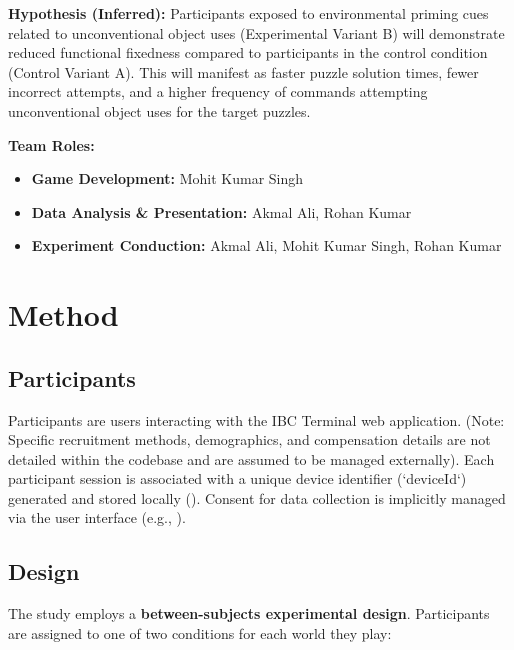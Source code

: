 \documentclass{article}
\begin{document}
\textbf{Hypothesis (Inferred):} Participants exposed to environmental priming cues related to unconventional object uses (Experimental Variant B) will demonstrate reduced functional fixedness compared to participants in the control condition (Control Variant A). This will manifest as faster puzzle solution times, fewer incorrect attempts, and a higher frequency of commands attempting unconventional object uses for the target puzzles.

\textbf{Team Roles:}
\begin{itemize}
    \item \textbf{Game Development:} Mohit Kumar Singh
    \item \textbf{Data Analysis \& Presentation:} Akmal Ali, Rohan Kumar
    \item \textbf{Experiment Conduction:} Akmal Ali, Mohit Kumar Singh, Rohan Kumar
\end{itemize}

\section{Method}

\subsection{Participants}
Participants are users interacting with the IBC Terminal web application. (Note: Specific recruitment methods, demographics, and compensation details are not detailed within the codebase and are assumed to be managed externally). Each participant session is associated with a unique device identifier (`deviceId`) generated and stored locally (). Consent for data collection is implicitly managed via the user interface (e.g., ).

\subsection{Design}
The study employs a \textbf{between-subjects experimental design}. Participants are assigned to one of two conditions for each world they play:
\end{document}
